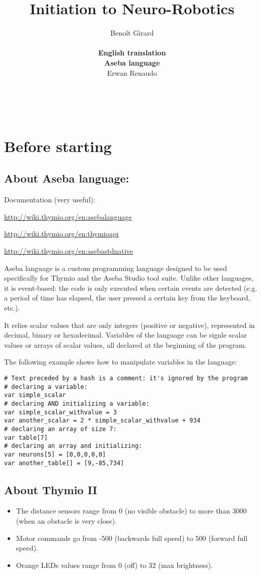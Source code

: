 \documentclass[12pt]{article}
\title{Initiation to Neuro-Robotics}
\author{Beno\^{i}t Girard\\\\\textbf{English translation}\\\textbf{Aseba language}\\ Erwan Renaudo}
\date{}
\begin{document}
\lstset{language=asebatext}

\maketitle

\tableofcontents


~\\

\section*{Before starting}
\subsection*{About Aseba language:}

Documentation (very useful):

\url{http://wiki.thymio.org/en:asebalanguage}

\url{http://wiki.thymio.org/en:thymioapi}

\url{http://wiki.thymio.org/en:asebastdnative}

Aseba language is a custom programming language designed to be used specifically for Thymio and the Aseba Studio tool suite. Unlike other languages, it is event-based: the code is only executed when certain events are detected (e.g. a period of time has elapsed, the user pressed a certain key from the keyboard, etc.).

It relies scalar values that are only integers (positive or negative), represented in decimal, binary or hexadecimal. Variables of the language can be signle scalar values or arrays of scalar values, all declared at the beginning of the program.

The following example shows how to manipulate variables in the language:

\begin{lstlisting}
# Text preceded by a hash is a comment: it's ignored by the program
# declaring a variable:
var simple_scalar
# declaring AND initializing a variable:
var simple_scalar_withvalue = 3
var another_scalar = 2 * simple_scalar_withvalue + 934
# declaring an array of size 7:
var table[7]
# declaring an array and initializing:
var neurons[5] = [0,0,0,0,0]
var another_table[] = [9,-85,734]
\end{lstlisting}

\subsection*{About Thymio II}
\begin{itemize}
    \item The distance sensors range from 0 (no visible obstacle) to more than 3000 (when an obstacle is very close).
    \item Motor commands go from -500 (backwards full speed) to 500 (forward full speed).
    \item Orange LEDs values range from 0 (off) to 32 (max brightness).
\end{itemize}
\end{document}
